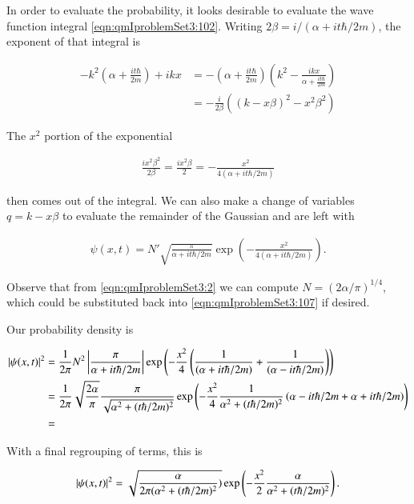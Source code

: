 In order to evaluate the probability, it looks desirable to evaluate the wave function integral \ref{eqn:qmIproblemSet3:102}.  
Writing $2 \beta = i/(\alpha + i t \hbar/2m )$, the exponent of that integral is

\begin{align*}
-k^2 \left( \alpha + \frac{i t \hbar }{2m} \right) + i k x
&=
-\left( \alpha + \frac{i t \hbar }{2m} \right) \left( k^2 - \frac{i k x }{\alpha + \frac{i t \hbar }{2m} } \right) \\
&=
-\frac{i}{2\beta} \left( (k - x \beta )^2 - x^2 \beta^2 \right)
\end{align*}

The $x^2$ portion of the exponential

\begin{align*}
\frac{i x^2 \beta^2}{2\beta} = \frac{i x^2 \beta}{2} = - \frac{x^2 }{4 (\alpha + i t \hbar /2m)}
\end{align*}

then comes out of the integral.  We can also make a change of variables $q = k - x \beta$ to evaluate the remainder of the Gaussian and are left with

\begin{align}\label{eqn:qmIproblemSet3:107}
\psi(x,t) =
N' \sqrt{ \frac{\pi}{\alpha + i t \hbar/2m} } \exp\left( - \frac{x^2 }{4 (\alpha + i t \hbar /2m)} \right).
\end{align}

Observe that from \ref{eqn:qmIproblemSet3:2} we can compute $N = (2 \alpha/\pi)^{1/4}$, which could be substituted back into \ref{eqn:qmIproblemSet3:107} if desired.

Our probability density is 

\begin{align*}
\left\lvert{ \psi(x,t) }\right\rvert^2 
&=
\frac{1}{2 \pi} N^2 \left\lvert{ \frac{\pi}{\alpha + i t \hbar/2m} }\right\rvert \exp\left( - \frac{x^2}{4} \left( 
\frac{1}{(\alpha + i t \hbar /2m)} + \frac{1}{(\alpha - i t \hbar /2m)} 
\right) \right) \\
&=
\frac{1}{2 \pi} \sqrt{\frac{2 \alpha}{\pi} } \frac{\pi}{\sqrt{\alpha^2 + (t \hbar/2m)^2 }} \exp\left( - \frac{x^2}{4} 
\frac{1}{\alpha^2 + (t \hbar/2m)^2 } \left( 
\alpha - i t \hbar /2m + \alpha + i t \hbar /2m 
\right)
\right) \\
&=
\end{align*}

With a final regrouping of terms, this is

\begin{align}\label{eqn:qmIproblemSet3:110}
\left\lvert{ \psi(x,t) }\right\rvert^2 =
\sqrt{\frac{ \alpha }{ 2 \pi (\alpha^2 + (t \hbar/2m)^2 }) }
\exp\left( - \frac{x^2}{2} 
\frac{\alpha}{\alpha^2 + (t \hbar/2m)^2 } 
\right).
\end{align}

